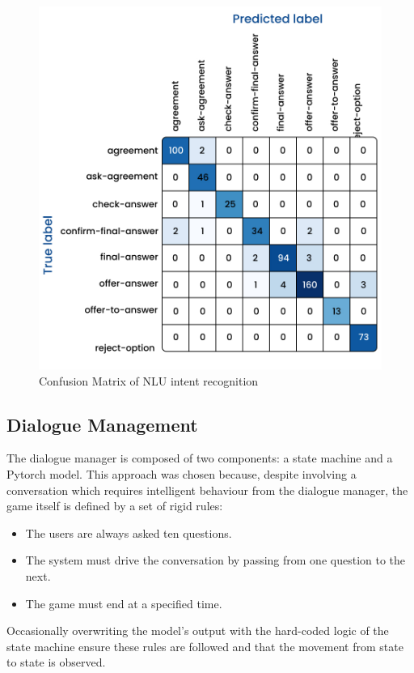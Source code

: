\documentclass[hidelinks, 11pt]{article}
\begin{document}
\begin{figure}[h!]
  \includegraphics[width=\columnwidth]{images/intent_confusion_matrix.jpg}
  \caption{Confusion Matrix of NLU intent recognition}
  \label{fig:cm_intent_recognition}
\end{figure}

\subsection{Dialogue Management}
\label{subsec:dialogue_management}

The dialogue manager is composed of two components: a state machine and a Pytorch model. This approach was chosen because, despite involving a conversation which requires intelligent behaviour from the dialogue manager, the game itself is defined by a set of rigid rules:
\begin{itemize}
  \item The users are always asked ten questions.
  \item The system must drive the conversation by passing from one question to the next.
  \item The game must end at a specified time.
\end{itemize}
\noindent Occasionally overwriting the model's output with the hard-coded logic of the state machine ensure these rules are followed and that the movement from state to state is observed.
\end{document}

